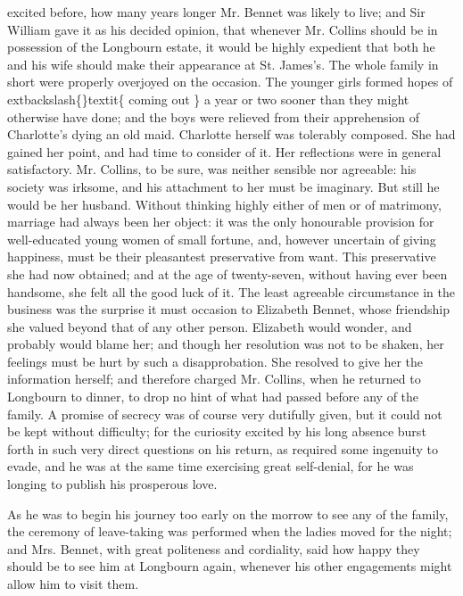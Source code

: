\documentclass[10pt]{book}
\begin{document}
   excited before, how many years longer Mr. Bennet was likely to live; and
Sir William gave it as his decided opinion, that whenever Mr. Collins
should be in possession of the Longbourn estate, it would be highly
expedient that both he and his wife should make their appearance at St.
James’s. The whole family in short were properly overjoyed on the
occasion. The younger girls formed
   hopes of
   	extbackslash\{\}textit\{
    coming out
   \}
   a year or two
sooner than they might otherwise have done; and the boys were relieved
from their apprehension of Charlotte’s dying an old maid. Charlotte
herself was tolerably composed. She had gained her point, and had time
to consider of it. Her reflections were in general satisfactory. Mr.
Collins, to be sure, was neither sensible nor agreeable: his society was
irksome, and his attachment to her must be imaginary. But still he would
be her husband. Without thinking highly either of men or of matrimony,
marriage had always been her object: it was the only honourable
provision for well-educated young women of small fortune, and, however
uncertain of giving happiness, must be their pleasantest preservative
from want. This preservative she had now obtained; and at the age of
twenty-seven, without having ever been handsome, she felt all the good
luck of it. The least agreeable circumstance in the business was the
surprise it must occasion to Elizabeth Bennet, whose friendship she
valued beyond that of any other person. Elizabeth would wonder, and
probably would blame her; and though her resolution was not to be
shaken, her feelings must be hurt by such a disapprobation. She resolved
to give her the information herself; and therefore charged Mr. Collins,
when he returned to Longbourn to dinner, to drop no hint of what had
passed before any of the family. A promise of secrecy was of course very
dutifully given, but it could not be kept without difficulty; for the
curiosity excited by his long absence burst forth in such very direct
questions on his return, as required some ingenuity to evade, and he was
at the same time exercising great self-denial, for he was longing to
publish his prosperous love.
  

   As he was to begin his journey too early on the morrow
   to see any of
the family, the ceremony of leave-taking was performed when the ladies
moved for the night; and Mrs. Bennet, with great politeness and
cordiality, said how happy they should be to see him at Longbourn again,
whenever his other engagements might allow him to visit them.
  
\end{document}
